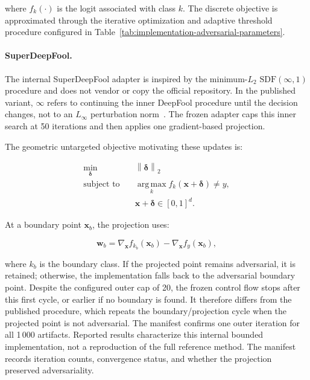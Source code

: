 where \(f_k(\cdot)\) is the logit associated with class \(k\). The discrete
objective is approximated through the iterative optimization and adaptive
threshold procedure configured in
Table~\ref{tab:implementation-adversarial-parameters}.

\paragraph{SuperDeepFool.}

The internal SuperDeepFool adapter is inspired by the minimum-\(L_2\)
\(\mathrm{SDF}(\infty,1)\) procedure and does not vendor or copy the official
repository. In the published variant, \(\infty\) refers to continuing the
inner DeepFool procedure until the decision changes, not to an \(L_\infty\)
perturbation norm~\cite{zhang2024superdeepfool}. The frozen adapter caps this
inner search at 50 iterations and then applies one gradient-based projection.

The geometric untargeted objective motivating these updates is:

\[
\begin{aligned}
\min_{\boldsymbol{\delta}}\quad &
\left\|
\boldsymbol{\delta}
\right\|_2
\\
\text{subject to}\quad &
\operatorname*{arg\,max}_{k}
f_k(\mathbf{x}+\boldsymbol{\delta})
\neq
y,
\\
&
\mathbf{x}+\boldsymbol{\delta}
\in [0,1]^d.
\end{aligned}
\]

At a boundary point \(\mathbf{x}_{b}\), the projection uses:

\begin{equation}
\mathbf{w}_{b}
=
\nabla_{\mathbf{x}} f_{k_b}(\mathbf{x}_{b})
-
\nabla_{\mathbf{x}} f_{y}(\mathbf{x}_{b}),
\end{equation}

where \(k_b\) is the boundary class. If the projected point remains
adversarial, it is retained; otherwise, the implementation falls back to the
adversarial boundary point. Despite the configured outer cap of 20, the frozen
control flow stops after this first cycle, or earlier if no boundary is found.
It therefore differs from the published procedure, which repeats the
boundary/projection cycle when the projected point is not adversarial. The
manifest confirms one outer iteration for all 1\,000 artifacts. Reported
results characterize this internal bounded implementation, not a reproduction
of the full reference method. The manifest records iteration counts,
convergence status, and whether the projection preserved adversariality.

